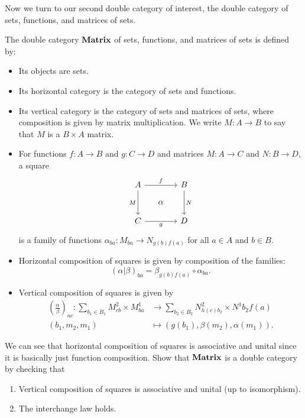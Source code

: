 \documentclass[DynamicalBook]{subfiles}
\begin{document}
Now we turn to our second double category of interest, the double category of
sets, functions, and matrices of sets.
\begin{definition}\label{def.double_cat_of_matrices}
  The double category $\textbf{Matrix}$ of sets, functions, and matrices of sets
  is defined by:
  \begin{itemize}
    \item Its objects are sets.
    \item Its horizontal category is the category of sets and functions.
    \item Its vertical category is the category of sets and matrices of sets,
      where composition is given by matrix multiplication. We write $M : A
      \to B$ to say that $M$ is a $B \times A$ matrix.
    \item For functions $f : A \to B$ and $g : C \to D$ and matrices $M : A
       \to C$ and $N : B \to D$, a square
       \[
        \begin{tikzcd}[sep=small]
          A \ar[dd, "M"'] \ar[rr, "f"] & & B \ar[dd, "N"] \\
           & \alpha & \\
          C \ar[rr, "g"'] & & D
        \end{tikzcd}
       \]
       is a family of functions $\alpha_{ba} : M_{ba} \to N_{g(b)f(a)}$ for all
       $a \in A$ and $b \in B$.
     \item Horizontal composition of squares is given by composition of the
       families:
       $$(\alpha | \beta)_{ba} = \beta_{g(b)f(a)} \circ \alpha_{ba}.$$
     \item Vertical composition of squares is given by
       \begin{align*}
         \left( \frac{\alpha}{\beta} \right)_{ac} : \sum_{b_1 \in B_1} M^2_{cb} \times M^1_{ba} &\to \sum_{b_2 \in B_2} N^2_{h(c)b_2} \times N^1{b_2f(a)} \\
         (b_1, m_2, m_1) &\mapsto (g(b_1), \beta(m_2), \alpha(m_1)).
       \end{align*}
  \end{itemize}
\end{definition}


\begin{exercise}\label{ex.double_cat_of_matrices}
  We can see that horizontal composition of squares is associative and unital
  since it is basically just function composition. Show that $\textbf{Matrix}$ is a
  double category by checking that
  \begin{enumerate}
    \item Vertical composition of squares is associative and unital (up to isomorphism).
      \item The interchange law holds.
  \end{enumerate}
\end{exercise}
\end{document}

